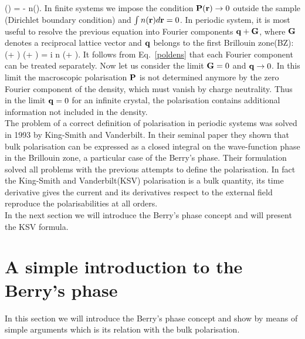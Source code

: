 \nabla \cdot \PP(\rr) = - n(\rr).
\ee                              
In finite systems we impose the condition  ${\bf P}({\bf r}) \rightarrow 0 $ outside the sample (Dirichlet boundary condition) and $\int n({\bf r}) d{\bf r}=0$.
In periodic system, it is most useful to resolve the previous equation into Fourier components ${\bf q}+ {\bf G}$,
where ${\bf G}$ denotes a reciprocal lattice vector and ${\bf q}$ belongs to the first Brillouin zone(BZ):
\be
(\qq + \GG) \cdot \PP(\qq + \GG) = i n (\qq + \GG).
\label{poldens}
\ee
It follows from Eq.~\ref{poldens} that each Fourier component can be treated separately. Now let us consider the limit ${\bf G}=0$ and ${\bf q} \rightarrow 0$. In this limit  the macroscopic polarisation ${\bf P}$ is not determined anymore by the zero Fourier component of the density, which must vanish by charge neutrality.  Thus in the limit ${\bf q} = 0$ for an infinite crystal, the polarisation contains additional information not included in the density.\cite{Martin1998} \\
The problem of a correct definition of polarisation in periodic systems was solved in 1993 by  King-Smith and Vanderbilt.\cite{KSV1} In their seminal paper they shown that  bulk polarisation can be expressed as a closed integral on the wave-function phase in the Brillouin zone, a particular case of the Berry's phase. Their formulation solved all problems with the previous attempts to define the polarisation. In fact the King-Smith and Vanderbilt(KSV) polarisation is a bulk quantity, its time derivative gives the current and its derivatives respect to the external field reproduce the polarisabilities at all orders.\\
In the next section we will introduce the Berry's phase concept and will present the KSV formula.
\section{A simple introduction to the Berry's phase}
\label{berrysection}
In this section we will introduce the Berry's phase concept\cite{berry1984quantal} and show by means of simple arguments which is its relation with the bulk polarisation.
 
